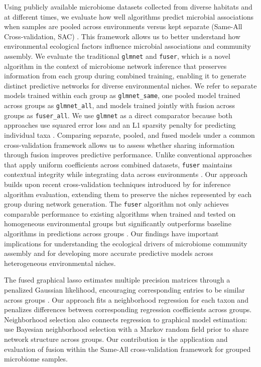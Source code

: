 \documentclass[]{Liebert_Author_revised}
\providecommand{\DIFadd}[1]{{\ifmmode\else\leavevmode\fi\color{blue}#1}} %
\providecommand{\DIFaddbegin}{} %
\providecommand{\DIFaddend}{} %
\begin{document}
Using publicly available microbiome datasets collected from diverse habitats and at different times, we evaluate how well algorithms predict microbial associations when samples are pooled across environments versus kept separate (Same-All Cross-validation, SAC) \citep{thaiss2016microbiome,thompson2017}.
This framework allows us to better understand how environmental ecological factors influence microbial associations and community assembly.
We evaluate the traditional \texttt{glmnet} and \texttt{fuser}, which is a novel algorithm in the context of microbiome network inference that preserves  \DIFaddbegin \DIFadd{information from each group }\DIFaddend during combined training, enabling it to generate distinct predictive networks for diverse environmental niches.
\DIFaddbegin \DIFadd{We refer to separate models trained within each group as \texttt{glmnet\_same}, one pooled model trained across groups as \texttt{glmnet\_all}, and models trained jointly with fusion across groups as \texttt{fuser\_all}.
We use \texttt{glmnet} as a direct comparator because both approaches use squared error loss and an L1 sparsity penalty for predicting individual taxa \citep{friedman2010glmnet,dondelinger2016hdlss}.
Comparing separate, pooled, and fused models under a common cross-validation framework allows us to assess whether sharing information through fusion improves predictive performance.
}\DIFaddend Unlike conventional approaches that apply uniform coefficients across combined datasets, \texttt{fuser} maintains contextual integrity while integrating data across environments \citep{papoutsoglou2023machine}.
Our approach builds upon recent cross-validation techniques introduced by \citet{agyapong2025cross} for inference algorithm evaluation, extending them to preserve  \DIFaddbegin \DIFadd{the niches represented by each group }\DIFaddend during network generation.
The \texttt{fuser} algorithm not only achieves comparable performance to existing algorithms when trained and tested on homogeneous environmental  \DIFaddbegin \DIFadd{groups }\DIFaddend but significantly outperforms baseline algorithms in  \DIFaddbegin \DIFadd{predictions across groups }\DIFaddend \citep{moreno2021statistical}.
Our findings have important implications for understanding the ecological drivers of microbiome community assembly and for developing more accurate predictive models across heterogeneous environmental niches.

 \DIFaddbegin \DIFadd{The fused graphical lasso estimates multiple precision matrices through a penalized Gaussian likelihood, encouraging corresponding entries to be similar across groups \citep{danaher2014joint}.
Our approach fits a neighborhood regression for each taxon and penalizes differences between corresponding regression coefficients across groups.
Neighborhood selection also connects regression to graphical model estimation: \citet{lin2017joint} use Bayesian neighborhood selection with a Markov random field prior to share network structure across groups.
Our contribution is the application and evaluation of fusion within the }\DIFaddend Same-All  \DIFaddbegin \DIFadd{cross-validation framework for grouped microbiome samples}\DIFaddend .
\end{document}
